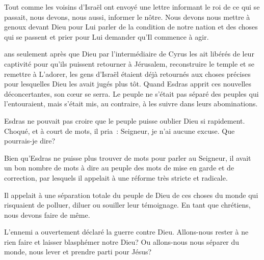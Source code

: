 Tout comme les voisins d'Israël ont envoyé une lettre informant
 le roi de ce qui se passait, nous devons, nous aussi, informer le nôtre.
 Nous devons nous mettre à genoux devant Dieu pour Lui parler de la condition
 de notre nation et des choses qui se passent \ocadr{}et prier pour Lui demander
 qu'Il commence à agir. 

\dvrule







 ans seulement après que Dieu
 \ocadr{}par l'intermédiaire de Cyrus\fcadr{} les ait libérés de leur captivité
 pour qu'ils puissent retourner à Jérusalem,
 reconstruire le temple et se remettre à L'adorer,
 les gens d'Israël étaient déjà retournés aux choses précises
 pour lesquelles Dieu les avait jugés plus tôt.
 Quand Esdras apprit ces nouvelles déconcertantes, son cœur se serra.
 Le peuple ne s'était pas séparé des peuples qui l'entouraient,
 mais s'était mis, au contraire, à les suivre dans leurs abominations.

Esdras ne pouvait pas croire que le peuple puisse oublier Dieu si rapidement.
 Choqué, et à court de mots, il pria~: \og Seigneur, je n'ai aucune excuse.
 Que pourrais-je dire? \fg{}

Bien qu'Esdras ne puisse plus trouver de mots pour parler au Seigneur,
 il avait un bon nombre de mots à dire au peuple \ocadr{}des mots de mise en garde
 et de correction, par lesquels il appelait à une réforme très stricte
 et radicale.

Il appelait à une séparation totale du peuple de Dieu de ces choses du monde
 qui risquaient de polluer, diluer ou souiller leur témoignage.
 En tant que chrétiens, nous devons faire de même. 



L'ennemi a ouvertement déclaré la guerre contre Dieu.
 Allons-nous rester à ne rien faire et laisser blasphémer notre Dieu?
 Ou allons-nous nous séparer du monde, nous lever et prendre parti pour Jésus? 

